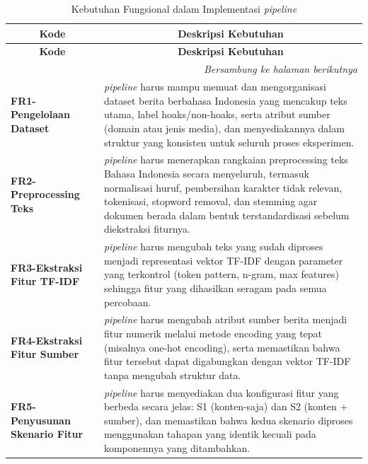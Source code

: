 \begin{longtable}{| p{3cm} | p{9cm} |}
\caption{Kebutuhan Fungsional dalam Implementasi \textit{pipeline}}
\label{tbl:kebutuhan-fungsional} \\
\hline
\multicolumn{1}{|c|}{\textbf{Kode}} &
\multicolumn{1}{c|}{\textbf{Deskripsi Kebutuhan}} \\
\hline
\endfirsthead

\hline
\multicolumn{1}{|c|}{\textbf{Kode}} &
\multicolumn{1}{c|}{\textbf{Deskripsi Kebutuhan}} \\
\hline
\endhead

\hline
\multicolumn{2}{r}{\textit{Bersambung ke halaman berikutnya}} \\
\endfoot

\hline
\endlastfoot

    \textbf{FR1-Pengelolaan Dataset}
    & \textit{pipeline} harus mampu memuat dan mengorganisasi dataset berita berbahasa Indonesia yang mencakup teks utama, label hoaks/non-hoaks, serta atribut sumber (domain atau jenis media), dan menyediakannya dalam struktur yang konsisten untuk seluruh proses eksperimen. \\

    \hline
    \textbf{FR2-Preprocessing Teks} 
    & \textit{pipeline} harus menerapkan rangkaian preprocessing teks Bahasa Indonesia secara menyeluruh, termasuk normalisasi huruf, pembersihan karakter tidak relevan, tokenisasi, stopword removal, dan stemming agar dokumen berada dalam bentuk terstandardisasi sebelum diekstraksi fiturnya. \\

    \hline
    \textbf{FR3-Ekstraksi Fitur TF-IDF} 
    & \textit{pipeline} harus mengubah teks yang sudah diproses menjadi representasi vektor TF-IDF dengan parameter yang terkontrol (token pattern, n-gram, max features) sehingga fitur yang dihasilkan seragam pada semua percobaan. \\

    \hline
    \textbf{FR4-Ekstraksi Fitur Sumber} 
    & \textit{pipeline} harus mengubah atribut sumber berita menjadi fitur numerik melalui metode encoding yang tepat (misalnya one-hot encoding), serta memastikan bahwa fitur tersebut dapat digabungkan dengan vektor TF-IDF tanpa mengubah struktur data. \\

    \hline
    \textbf{FR5-Penyusunan Skenario Fitur} 
    & \textit{pipeline} harus menyediakan dua konfigurasi fitur yang berbeda secara jelas: S1 (konten-saja) dan S2 (konten + sumber), dan memastikan bahwa kedua skenario diproses menggunakan tahapan yang identik kecuali pada komponennya yang ditambahkan. \\


\end{longtable}
